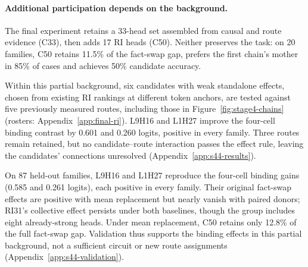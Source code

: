 \paragraph{Additional participation depends on the background.}
The final experiment retains a 33-head set assembled from causal and route
evidence (C33), then adds 17 RI heads (C50). Neither preserves the task: on
20 families, C50 retains 11.5\% of the fact-swap gap, prefers the first chain's
mother in 85\% of cases and achieves 50\% candidate accuracy.

Within this partial background, six candidates with weak standalone effects,
chosen from existing RI rankings at different token anchors, are tested against
five previously measured routes, including those in Figure~\ref{fig:stage4-chains}
(rosters: Appendix~\ref{app:final-ri}). L9H16 and L1H27 improve the four-cell
binding contrast by 0.601 and 0.260 logits, positive in every family. Three
routes remain retained, but no candidate--route interaction passes the effect
rule, leaving the candidates' connections unresolved (Appendix~\ref{app:s44-results}).

On 87 held-out families, L9H16 and L1H27 reproduce the four-cell binding gains (0.585 and 0.261 logits), each positive in every family. Their original fact-swap effects are positive with mean replacement but nearly vanish with paired donors; RI31’s collective effect persists under both baselines, though the group includes eight already-strong heads. Under mean replacement, C50 retains only 12.8\% of the full fact-swap gap. Validation thus supports the binding effects in this partial background, not a sufficient circuit or new route assignments (Appendix~\ref{app:s44-validation}).
